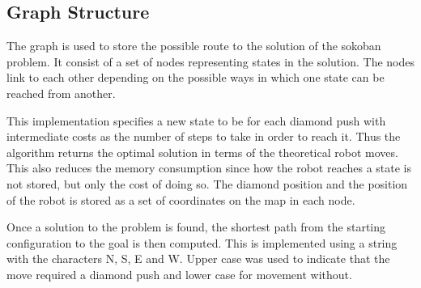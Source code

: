 
\subsection{Graph Structure}
The graph is used to store the possible route to the solution of the sokoban problem.
It consist of a set of nodes representing states in the solution.
The nodes link to each other depending on the possible ways in which one state can be reached from another.

This implementation specifies a new state to be for each diamond push with intermediate costs as the number of steps to take in order to reach it.
Thus the algorithm returns the optimal solution in terms of the theoretical robot moves.
This also reduces the memory consumption since how the robot reaches a state is not stored, but only the cost of doing so.
The diamond position and the position of the robot is stored as a set of coordinates on the map in each node.

Once a solution to the problem is found, the shortest path from the starting configuration to the goal is then computed.
This is implemented using a string with the characters N, S, E and W.
Upper case was used to indicate that the move required a diamond push and lower case for movement without.



